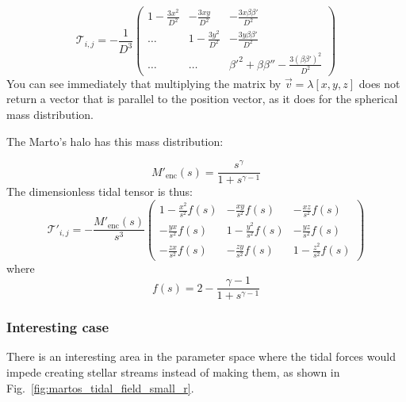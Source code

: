             \begin{equation}
                \mathcal{T}_{i,j}=-\frac{1}{D^3}\left(\begin{matrix}
                    1-\frac{3x^2}{D^2} & -\frac{3xy}{D^2} & -\frac{3x\beta \beta'}{D^2} \\
                    \dots & 1-\frac{3y^2}{D^2} & -\frac{3y\beta \beta'}{D^2} \\
                    \dots & \dots & \beta'^2 + \beta \beta'' -\frac{3\left(\beta\beta'\right)^2}{D^2}
                \end{matrix}\right)
            \end{equation}    
            You can see immediately that multiplying the matrix by $\vec{v}=\lambda\left[x,y,z\right]$ does not return a vector that is parallel to the position vector, as it does for the spherical mass distribution. 

            The Marto's halo has this mass distribution:
            
            \begin{equation}
                M'_\text{enc}(s) = \frac{s^\gamma}{1+s^{\gamma-1}}
            \end{equation}
            The dimensionless tidal tensor is thus: 
            \begin{equation}
                \mathcal{T'}_{i,j}= -\frac{M'_\text{enc}(s)}{s^3}\left(\begin{matrix}
                    1-\frac{x^2}{s^2}f(s) & -\frac{xy}{s^2}f(s) & -\frac{xz}{s^2}f(s) \\
                    -\frac{yx}{s^2}f(s) & 1-\frac{y^2}{s^2}f(s) & -\frac{yz}{s^2}f(s) \\
                    -\frac{zx}{s^2}f(s) & -\frac{zy}{s^2}f(s) & 1-\frac{z^2}{s^2}f(s)
                \end{matrix}\right)
            \end{equation}  
            where 
            \begin{equation}\label{eq:martos_f_s}
                f(s) = 2-\frac{\gamma-1}{1+s^{\gamma-1}}
            \end{equation}

        \subsubsection*{Interesting case}
            There is an interesting area in the parameter space where the tidal forces would impede creating stellar streams instead of making them, as shown in Fig.~\ref{fig:martos_tidal_field_small_r}.

